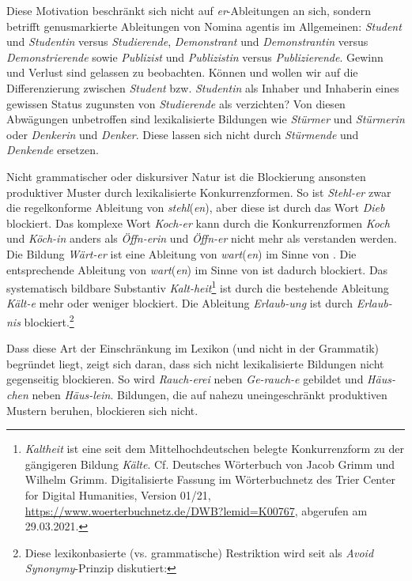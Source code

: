 Diese Motivation beschränkt sich nicht auf \textit{er}-Ableitungen an sich, sondern betrifft genusmarkierte Ableitungen von Nomina agentis im Allgemeinen: \textit{Student} und \textit{Studentin} versus \textit{Studierende}, \textit{Demonstrant} und \textit{Demonstrantin} versus \textit{Demonstrierende} sowie \textit{Publizist} und \textit{Publizistin} versus \textit{Publizierende}. Gewinn und Verlust sind gelassen zu beobachten. Können und wollen wir auf die Differenzierung zwischen \textit{Student} bzw. \textit{Studentin} als Inhaber und Inhaberin eines gewissen Status zugunsten von \textit{Studierende} als  verzichten? Von diesen Abwägungen unbetroffen sind lexikalisierte Bildungen wie \textit{Stürmer} und \textit{Stürmerin} oder \textit{Denkerin} und \textit{Denker}. Diese lassen sich nicht durch \textit{Stürmende} und \textit{Denkende} ersetzen.

Nicht grammatischer  oder diskursiver Natur ist die Blockierung ansonsten produktiver Muster durch lexikalisierte Konkurrenzformen. So ist \textit{Stehl-er} zwar die regelkonforme Ableitung von \textit{stehl}(\textit{en}), aber diese ist durch das Wort \textit{Dieb} blockiert. Das komplexe Wort \textit{Koch-er} kann durch die Konkurrenzformen \textit{Koch} und \textit{Köch-in} anders als \textit{Öffn-erin} und \textit{Öffn-er} nicht mehr als  verstanden werden. Die Bildung \textit{Wärt-er} ist eine Ableitung von \textit{wart}(\textit{en}) im Sinne von . Die entsprechende Ableitung von \textit{wart}(\textit{en}) im Sinne von  ist dadurch blockiert. Das systematisch bildbare Substantiv \textit{Kalt-heit}\footnote{\textit{Kaltheit} ist eine seit dem Mittelhochdeutschen belegte Konkurrenzform zu der gängigeren Bildung \textit{Kälte}. Cf. Deutsches Wörterbuch von Jacob Grimm und Wilhelm Grimm. Digitalisierte Fassung im Wörterbuchnetz des Trier Center for Digital Humanities, Version 01/21, \url{https://www.woerterbuchnetz.de/DWB?lemid=K00767}, abgerufen am 29.03.2021.} ist durch die bestehende Ableitung \textit{Kält-e} mehr oder weniger blockiert. Die Ableitung \textit{Erlaub-ung} ist durch \textit{Erlaub-nis} blockiert.\footnote{Diese lexikonbasierte (vs. grammatische) Restriktion wird seit \citet[16]{Kiparsky1983} als \textit{Avoid Synonymy}-Prinzip diskutiert: }

Dass diese Art der Einschränkung im Lexikon (und nicht in der Grammatik) begründet liegt, zeigt sich daran, dass sich nicht lexikalisierte Bildungen nicht gegenseitig blockieren. So wird \textit{Rauch-erei} neben \textit{Ge-rauch-e} gebildet und \textit{Häus-chen} neben \textit{Häus-lein}. Bildungen, die auf nahezu uneingeschränkt produktiven Mustern beruhen, blockieren sich nicht. 

